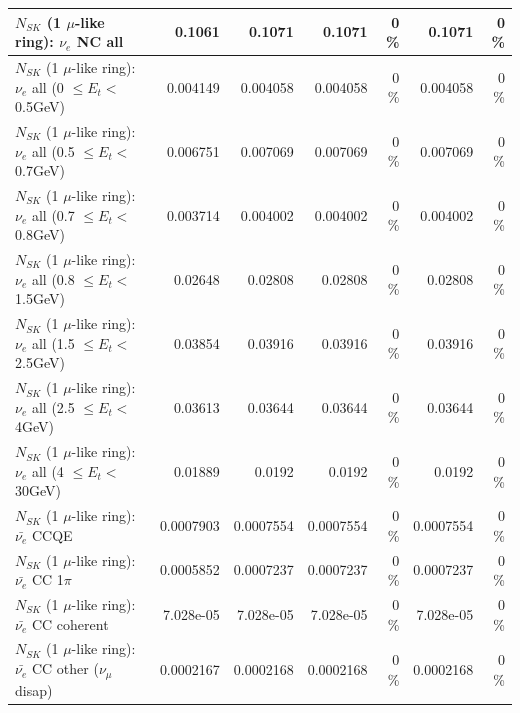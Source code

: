 \begin{table}
\begin{tabular}{| l | r | r | r  r | r  r |}
                                  $N_{SK}$ (1 $\mu$-like ring): $\nu_{e}$ NC all &          0.1061 &          0.1071 &          0.1071 &        0 \%  &          0.1071 &        0 \%  \\ 
\hline
           $N_{SK}$ (1 $\mu$-like ring): $\nu_{e}$ all (0 $\leq E_{t} <$ 0.5GeV) &        0.004149 &        0.004058 &        0.004058 &        0 \%  &        0.004058 &        0 \%  \\ 
         $N_{SK}$ (1 $\mu$-like ring): $\nu_{e}$ all (0.5 $\leq E_{t} <$ 0.7GeV) &        0.006751 &        0.007069 &        0.007069 &        0 \%  &        0.007069 &        0 \%  \\ 
         $N_{SK}$ (1 $\mu$-like ring): $\nu_{e}$ all (0.7 $\leq E_{t} <$ 0.8GeV) &        0.003714 &        0.004002 &        0.004002 &        0 \%  &        0.004002 &        0 \%  \\ 
         $N_{SK}$ (1 $\mu$-like ring): $\nu_{e}$ all (0.8 $\leq E_{t} <$ 1.5GeV) &         0.02648 &         0.02808 &         0.02808 &        0 \%  &         0.02808 &        0 \%  \\ 
         $N_{SK}$ (1 $\mu$-like ring): $\nu_{e}$ all (1.5 $\leq E_{t} <$ 2.5GeV) &         0.03854 &         0.03916 &         0.03916 &        0 \%  &         0.03916 &        0 \%  \\ 
           $N_{SK}$ (1 $\mu$-like ring): $\nu_{e}$ all (2.5 $\leq E_{t} <$ 4GeV) &         0.03613 &         0.03644 &         0.03644 &        0 \%  &         0.03644 &        0 \%  \\ 
            $N_{SK}$ (1 $\mu$-like ring): $\nu_{e}$ all (4 $\leq E_{t} <$ 30GeV) &         0.01889 &          0.0192 &          0.0192 &        0 \%  &          0.0192 &        0 \%  \\ 
\hline
\hline
\hline
                                $N_{SK}$ (1 $\mu$-like ring): $\bar{\nu_e}$ CCQE &       0.0007903 &       0.0007554 &       0.0007554 &        0 \%  &       0.0007554 &        0 \%  \\ 
                           $N_{SK}$ (1 $\mu$-like ring): $\bar{\nu_e}$ CC 1$\pi$ &       0.0005852 &       0.0007237 &       0.0007237 &        0 \%  &       0.0007237 &        0 \%  \\ 
                         $N_{SK}$ (1 $\mu$-like ring): $\bar{\nu_e}$ CC coherent &       7.028e-05 &       7.028e-05 &       7.028e-05 &        0 \%  &       7.028e-05 &        0 \%  \\ 
          $N_{SK}$ (1 $\mu$-like ring): $\bar{\nu_e}$ CC other ($\nu_\mu$ disap) &       0.0002167 &       0.0002168 &       0.0002168 &        0 \%  &       0.0002168 &        0 \%  \\ 

\end{tabular}
\end{table}
